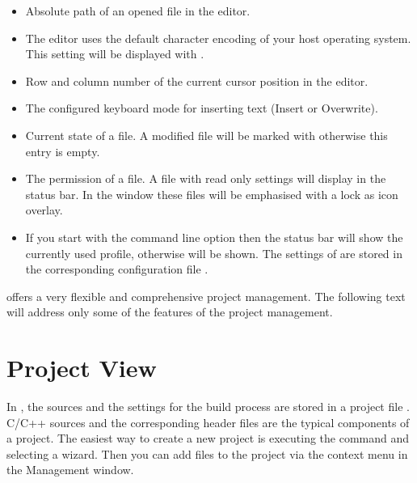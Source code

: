 \begin{itemize}
\item Absolute path of an opened file in the editor.
\item The editor uses the default character encoding of your host operating system. This setting will be displayed with .
\item Row and column number of the current cursor position in the editor.
\item The configured keyboard mode for inserting text (Insert or Overwrite).
\item Current state of a file. A modified file will be marked with  otherwise this entry is empty.
\item The permission of a file. A file with read only settings will display  in the status bar. In the window  these files will be emphasised with a lock as icon overlay.


\item If you start \codeblocks with the command line option  then the status bar will show the currently used profile, otherwise  will be shown. The settings of \codeblocks are stored in the corresponding configuration file .
\end{itemize}

\codeblocks offers a very flexible and comprehensive project management. The following text will address only some of the features of the project management.

\section{Project View}\label{sec:categories}

In \codeblocks, the sources and the settings for the build process are stored in a project file . C/C++ sources and the corresponding header files are the typical components of a project. The easiest way to create a new project is  executing the command  and selecting a wizard. Then you can add files to the project via the context menu  in the Management window.


